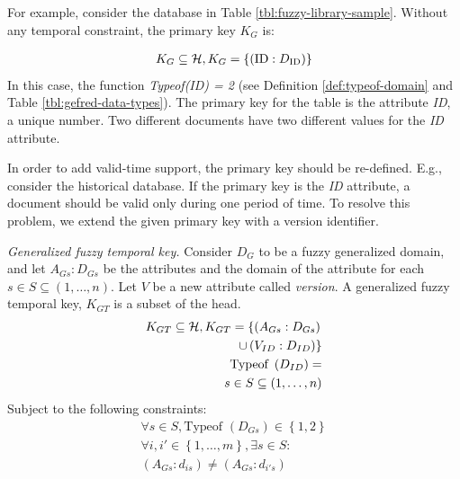For example, consider the database in Table \ref{tbl:fuzzy-library-sample}. Without any temporal constraint, the primary key $K_G$ is:

\begin{align}
\nonumber
K_G \subseteq \mathcal{H}, K_G = \left \lbrace  \left(\text{ID}:D_{\text{ID}} \right) \right \rbrace
\end{align}
In this case, the function \emph{Typeof(ID) = 2} (see Definition \ref{def:typeof-domain} and Table \ref{tbl:gefred-data-types}). The primary key for the table is the attribute \emph{ID}, a unique number. Two different documents have two different values for the \emph{ID} attribute.

In order to add valid-time support, the primary key should be re-defined. E.g., consider the historical database. If the primary key is the \emph{ID} attribute, a document should be valid only during one period of time. To resolve this problem, we extend the given primary key with a version identifier. 




\begin{definition}
\label{def:generalized-fuzzy-temporal-key}
\emph{Generalized fuzzy temporal key.}
Consider $D_G$ to be a fuzzy generalized domain, and let $A_{Gs}:D_{Gs}$ be the attributes and the domain of the attribute for each $s \in S \subseteq \left(1, \ldots, n \right)$. Let  $V$ be a new attribute called \emph{version}. 
A generalized fuzzy temporal key, $K_{GT}$ is a subset of the head.
\begin{align}
\label{eq:generalized-fuzzy-temporal-key}
K_{GT} \subseteq \mathcal{H}, K_{GT} = \left \lbrace  \left(A_{Gs}:D_{Gs} \right) \right.  \\
\nonumber
 \left. \cup  \left(V_{ID}:D_{ID} \right)	\right \rbrace \\
\nonumber
\text{Typeof }\left(D_{ID} \right) = \\
\nonumber
s\in S \subseteq \left(1, \ldots, n \right) \\
\end{align}
Subject to the following constraints:
\begin{align}
\forall s \in S, \text{Typeof } \left(D_{Gs} \right) \in \left \lbrace 1, 2 \right \rbrace \\
\nonumber
\forall i, i' \in \left \lbrace 1, \ldots, m\right \rbrace , \exists s \in S: \\
\nonumber
\left(A_{Gs}:d_{is} \right) \neq \left(A_{Gs}:d_{i's} \right)
\end{align}
\end{definition}

